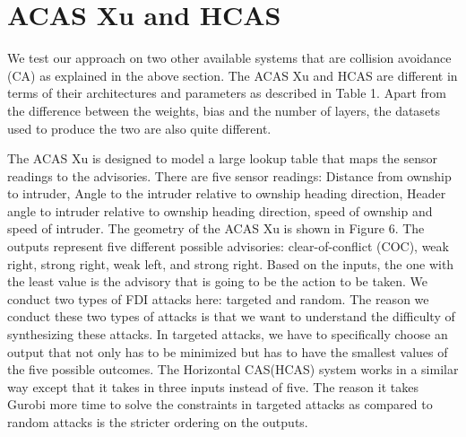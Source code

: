 




\section{ACAS Xu and HCAS}
We test our approach on two other available systems that are collision avoidance (CA) as explained in the above section. The ACAS Xu and HCAS are different in terms of their architectures and parameters as described in Table 1. Apart from the difference between the weights, bias and the number of layers, the datasets used to produce the two are also quite different.  

The ACAS Xu is designed to model a large lookup table that maps the sensor readings to the advisories. There are five sensor readings:  Distance from ownship to intruder, Angle to the intruder relative to ownship heading direction, Header angle to intruder relative to ownship heading direction, speed of ownship and speed of intruder. The geometry of the ACAS Xu is shown in Figure 6. The outputs represent five different possible advisories: clear-of-conflict (COC), weak right, strong right, weak left, and strong right. Based on the inputs, the one with the least value is the advisory that is going to be the action to be taken.  We conduct two types of FDI attacks here: targeted and random. The reason we conduct these two types of attacks is that we want to understand the difficulty of synthesizing these attacks. In targeted attacks, we have to specifically choose an output that not only has to be minimized but has to have the smallest values of the five possible outcomes. The Horizontal CAS(HCAS) system works in a similar way except that it takes in three inputs instead of five. %
The reason it takes Gurobi more time to solve the constraints in targeted attacks as compared to random attacks is the stricter ordering on the outputs.

